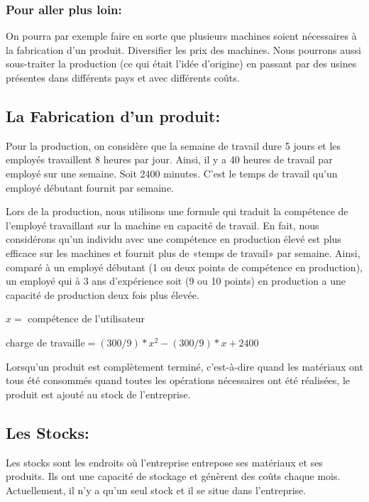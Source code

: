 \subsubsection*{Pour aller plus loin:} 



On pourra par exemple faire en sorte que plusieurs machines soient nécessaires à la fabrication d’un produit. Diversifier les prix des machines. Nous pourrons aussi sous-traiter la production (ce qui était l’idée d’origine) en passant par des usines présentes dans différents pays et avec différents coûts.



\subsection{La Fabrication d’un produit:}



Pour la production, on considère que la semaine de travail dure 5 jours et les employés travaillent 8 heures par jour. Ainsi, il y a 40 heures de travail par employé sur une semaine. Soit 2400 minutes. C’est le temps de travail qu’un employé débutant fournit par semaine.


Lors de la production, nous utilisons une formule qui traduit la compétence de l’employé travaillant sur la machine en capacité de travail. En fait, nous considérons qu’un individu avec une compétence en production élevé est plus efficace sur les machines et fournit plus de «temps de travail» par semaine. Ainsi, comparé à un employé débutant (1 ou deux points de compétence en production), un employé qui à 3 ans d’expérience soit (9 ou 10 points) en production a une capacité de production deux fois plus élevée. 

$x =$ compétence de l’utilisateur

charge de travaille$ = (300/9)*x^{2} - (300/9)*x + 2400$


Lorsqu’un produit est complètement terminé, c’est-à-dire quand les matériaux ont tous été consommés quand toutes les opérations nécessaires ont été réalisées, le produit est ajouté au stock de l’entreprise.


\subsection{Les Stocks:}


Les stocks sont les endroits où l’entreprise entrepose ses matériaux et ses produits. Ils ont une capacité de stockage et génèrent des coûts chaque mois. Actuellement, il n’y a qu’un seul stock et il se situe dans l’entreprise.


